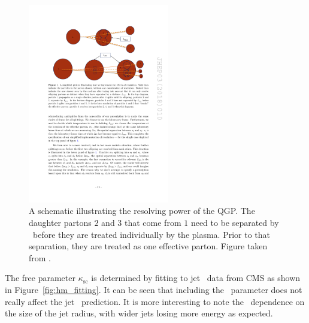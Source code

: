 \begin{figure}[htbp]
\begin{center}
\includegraphics[width=0.55\textwidth]{figures/jetMeasurements/HM_lres}
\caption{A schematic illustrating the resolving power of the QGP. The daughter partons $2$ and $3$ that come from $1$ need to be separated by \Lres\ before they are treated individually by the plasma. Prior to that separation, they are treated as one effective parton. Figure taken from \cite{Hulcher:2017cpt}.}
\label{fig:hm_lres}
\end{center}
\end{figure}


The free parameter $\kappa_\mathrm{sc}$ is determined by fitting to jet \RAA\ data from CMS \cite{Khachatryan:2016jfl} as shown in Figure~\ref{fig:hm_fitting}. It can be seen that including the \Lres\ parameter does not really affect the jet \RAA\ prediction. It is more interesting to note the \RAA\ dependence on the size of the jet radius, with wider jets losing more energy as expected. 


